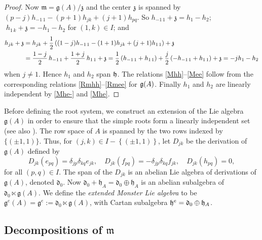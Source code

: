 \documentclass[11pt,letterpaper]{amsart}
\numberwithin{thecounter}{section}
\theoremstyle{definition}
\DeclareMathOperator{\gl}{\mathfrak{gl}}
\DeclareMathOperator{\ad}{ad}
\begin{document}
\begin{proof}
Now $\mathfrak{m}=\mathfrak{g}(A)/\mathfrak{z}$ and  the center $\mathfrak{z}$ is spanned by
$(p-j)h_{-1\,1}-(p+1)h_{jk}+(j+1)h_{pq}$.
So 
$h_{-1\,1}+\mathfrak{z}=h_1-h_2$; %
$\;h_{1\,k} + \mathfrak{z}=-h_1-h_2$ %
for $(1,k)\in I$; and %
\begin{align*}
h_{jk} + \mathfrak{z} &= h_{jk} + \frac{1}{2}\left((1-j)h_{-1\,1}-(1+1)h_{jk}+(j+1)h_{1\,1} \right) +\mathfrak{z} \\
&=\frac{1-j}{2}\,h_{-1\,1} +\frac{1+j}{2}\, h_{1\,1} +\mathfrak{z} = \frac12\left(h_{-1\,1}+h_{1\,1} \right) + \frac{j}2\left(-h_{-1\,1}+h_{1\,1} \right)+{\frak z}=-jh_1-h_2
\end{align*}
when $j\ne 1$. Hence $h_1$ and $h_2$ span ${\frak h}$. The relations  \eqref{Mhh}--\eqref{Mee} follow from the corresponding relations \eqref{Rmhh}--\eqref{Rmee} for ${\frak g}(A)$. Finally $h_1$ and $h_2$ are linearly independent by \eqref{Mhe-} and \eqref{Mhe}.
\end{proof}

Before defining the root system, we construct an extension of the Lie algebra~$\mathfrak{g}(A)$ in order to ensure that the simple roots form a linearly independent set (see also \cite{JLW}).
The row space of $A$ is spanned by the two rows indexed by~$\{(\pm1,1)\}$.
Thus, for $(j,k)\in I-\left\{(\pm1,1) \right\}$,  let  $D_{jk}$  be the derivation of $\mathfrak{g}(A)$ defined by
$$D_{jk} (e_{pq}) = \delta_{jp}\delta_{kq}e_{jk}, \quad D_{jk} (f_{pq}) = -\delta_{jp}\delta_{kq}f_{jk},\quad D_{jk} (h_{pq})=0,$$
for all $(p,q) \in I$.
The span of the $D_{jk}$ is an abelian Lie algebra of derivations of $\mathfrak{g}(A)$, denoted $\mathfrak{d}_0$. 
Now $\mathfrak{d}_0+\mathfrak{h}_A=\mathfrak{d}_0\oplus\mathfrak{h}_A$ is an abelian subalgebra of 
$\mathfrak{d}_0 \ltimes \mathfrak{g}(A)$.
We  define the \emph{extended Monster Lie algebra} to be $\mathfrak{g}^e(A)=\mathfrak{g}^e:=\mathfrak{d}_0 \ltimes \mathfrak{g}(A)$,
with Cartan subalgebra $\frak h^e=\frak d_0 \oplus \frak h_A$. 


\subsection{Decompositions of $\mathfrak m$}\label{SS-decomp}
 
\end{document}
